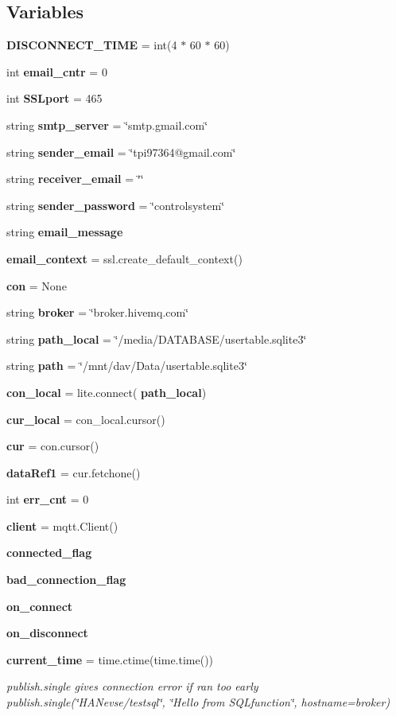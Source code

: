 \subsection*{Variables}
\begin{DoxyCompactItemize}
\item 
\textbf{ D\+I\+S\+C\+O\+N\+N\+E\+C\+T\+\_\+\+T\+I\+ME} = int(4 $\ast$ 60 $\ast$ 60)
\item 
int \textbf{ email\+\_\+cntr} = 0
\item 
int \textbf{ S\+S\+Lport} = 465
\item 
string \textbf{ smtp\+\_\+server} = \char`\"{}smtp.\+gmail.\+com\char`\"{}
\item 
string \textbf{ sender\+\_\+email} = \char`\"{}tpi97364@gmail.\+com\char`\"{}
\item 
string \textbf{ receiver\+\_\+email} = \char`\"{}\char`\"{}
\item 
string \textbf{ sender\+\_\+password} = \char`\"{}controlsystem\char`\"{}
\item 
string \textbf{ email\+\_\+message}
\item 
\textbf{ email\+\_\+context} = ssl.\+create\+\_\+default\+\_\+context()
\item 
\textbf{ con} = None
\item 
string \textbf{ broker} = \char`\"{}broker.\+hivemq.\+com\char`\"{}
\item 
string \textbf{ path\+\_\+local} = \char`\"{}/media/D\+A\+T\+A\+B\+A\+SE/usertable.\+sqlite3\char`\"{}
\item 
string \textbf{ path} = \char`\"{}/mnt/dav/Data/usertable.\+sqlite3\char`\"{}
\item 
\textbf{ con\+\_\+local} = lite.\+connect(\textbf{ path\+\_\+local})
\item 
\textbf{ cur\+\_\+local} = con\+\_\+local.\+cursor()
\item 
\textbf{ cur} = con.\+cursor()
\item 
\textbf{ data\+Ref1} = cur.\+fetchone()
\item 
int \textbf{ err\+\_\+cnt} = 0
\item 
\textbf{ client} = mqtt.\+Client()
\item 
\textbf{ connected\+\_\+flag}
\item 
\textbf{ bad\+\_\+connection\+\_\+flag}
\item 
\textbf{ on\+\_\+connect}
\item 
\textbf{ on\+\_\+disconnect}
\item 
\textbf{ current\+\_\+time} = time.\+ctime(time.\+time())
\begin{DoxyCompactList}\small\item\em publish.\+single gives connection error if ran too early publish.\+single(\char`\"{}\+H\+A\+Nevse/testsql\char`\"{}, \char`\"{}\+Hello from S\+Q\+Lfunction\char`\"{}, hostname=broker) \end{DoxyCompactList}\end{DoxyCompactItemize}


